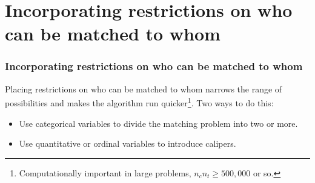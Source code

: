 \section{Incorporating restrictions on who can be matched to whom}


\begin{frame}[label=incorpRestrictFr]
\frametitle{Incorporating restrictions on who can be matched to whom}


Placing restrictions on who can be matched to whom narrows the
range of possibilities and makes the algorithm run quicker\footnote{Computationally important in large problems,  $n_cn_t \geq 500,000$ or so.}.  Two
ways to do this:
\begin{itemize}[<+-| alert@+>]
\item Use categorical variables to divide the matching problem into two or more.
\item Use quantitative or ordinal variables to introduce calipers.
\end{itemize}

\end{frame}







